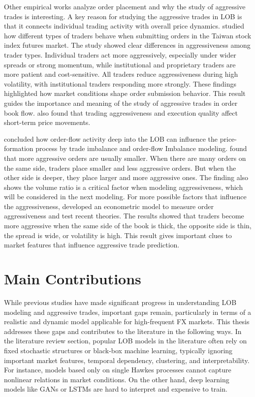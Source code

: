 Other empirical works analyze order placement and why the study of aggressive trades is interesting. A key reason for studying the aggressive trades in LOB is that it connects individual trading activity with overall price dynamics. \cite{chiu_order_2017} studied how different types of traders behave when submitting orders in the Taiwan stock index futures market. The study showed clear differences in aggressiveness among trader types. Individual traders act more aggressively, especially under wider spreads or strong momentum, while institutional and proprietary traders are more patient and cost-sensitive. All traders reduce aggressiveness during high volatility, with institutional traders responding more strongly. These findings highlighted how market conditions shape order submission behavior. This result guides the importance and meaning of the study of aggressive trades in order book flow. \cite{HUNG2019231} also found that trading aggressiveness and execution quality affect short-term price movements. 

\cite{xu2019multilevelorderflowimbalancelimit} concluded how order-flow activity deep into the LOB can influence the price-formation process by trade imbalance and order-flow Imbalance modeling. \cite{OrderAggressiveness2010} found that more aggressive orders are usually smaller. When there are many orders on the same side, traders place smaller and less aggressive orders. But when the other side is deeper, they place larger and more aggressive ones. The finding also shows the volume ratio is a critical factor when modeling aggressiveness, which will be considered in the next modeling. For more possible factors that influence the aggressiveness, \cite{RANALDO200453} developed an econometric model to measure order aggressiveness and test recent theories. The results showed that traders become more aggressive when the same side of the book is thick, the opposite side is thin, the spread is wide, or volatility is high. This result gives important clues to market features that influence aggressive trade prediction.


\section{Main Contributions} \label{sec:maincontributions}
While previous studies have made significant progress in understanding LOB modeling and aggressive trades, important gaps remain, particularly in terms of a realistic and dynamic model applicable for high-frequent FX markets. This thesis addresses these gaps and contributes to the literature in the following ways. In the literature review section, popular LOB models in the literature often rely on fixed stochastic structures or black-box machine learning, typically ignoring important market features, temporal dependency, clustering, and interpretability. For instance, models based only on single Hawkes processes cannot capture nonlinear relations in market conditions. On the other hand, deep learning models like GANs or LSTMs are hard to interpret and expensive to train.

